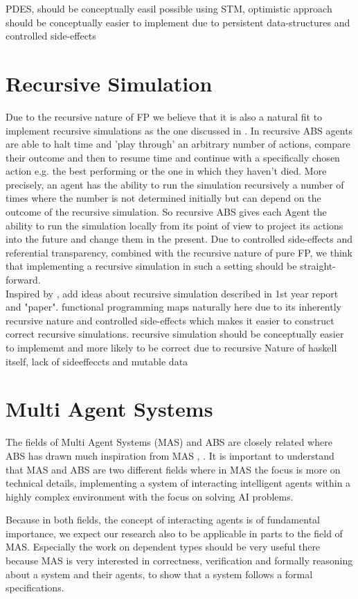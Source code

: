 PDES, should be  conceptually easil possible using STM, optimistic approach should be conceptually easier to implement due to persistent data-structures and controlled side-effects
 
\section{Recursive Simulation}
Due to the recursive nature of FP we believe that it is also a natural fit to implement recursive simulations as the one discussed in \cite{gilmer_recursive_2000}. In recursive ABS agents are able to halt time and 'play through' an arbitrary number of actions, compare their outcome and then to resume time and continue with a specifically chosen action e.g. the best performing or the one in which they haven't died. More precisely, an agent has the ability to run the simulation recursively a number of times where the number is not determined initially but can depend on the outcome of the recursive simulation. So recursive ABS gives each Agent the ability to run the simulation locally from its point of view to project its actions into the future and change them in the present. Due to controlled side-effects and referential transparency, combined with the recursive nature of pure FP, we think that implementing a recursive simulation in such a setting should be straight-forward.\\

Inspired by \cite{gilmer_recursive_2000}, add ideas about recursive simulation described in 1st year report and "paper". functional programming maps naturally here due to its inherently recursive nature and controlled side-effects which makes it easier to construct correct recursive simulations.
recursive simulation should be conceptually easier to implememt and more likely to be correct due to recursive Nature of haskell itself, lack of sideeffeccts and mutable data

\section{Multi Agent Systems}
The fields of Multi Agent Systems (MAS) and ABS are closely related where ABS has drawn much inspiration from MAS \cite{wooldridge_introduction_2009}, \cite{weiss_multiagent_2013}. It is important to understand that MAS and ABS are two different fields where in MAS the focus is more on technical details, implementing a system of interacting intelligent agents within a highly complex environment with the focus on solving AI problems.

Because in both fields, the concept of interacting agents is of fundamental importance, we expect our research also to be applicable in parts to the field of MAS. Especially the work on dependent types should be very useful there because MAS is very interested in correctness, verification and formally reasoning about a system and their agents, to show that a system follows a formal specifications.
